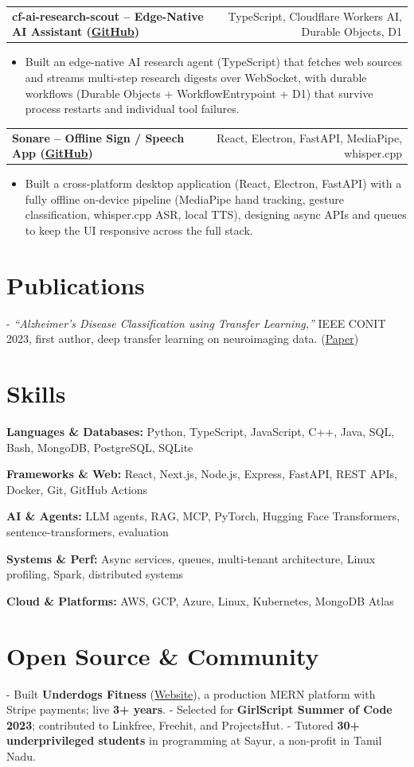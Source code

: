 \documentclass[letterpaper,11pt]{article}
\makeatletter
\newcommand{\projItem}[2]{%
  \vspace{2pt}
  \begin{tabular*}{\textwidth}{@{}l@{\extracolsep{\fill}}r@{}}
    \textbf{#1} & #2 \\
  \end{tabular*}\par\vspace{-3pt}
}
\newcommand{\skillLine}[2]{\textbf{#1:} #2\par\vspace{1.5pt}}
\newcommand{\inlineBlock}[1]{{\setlength{\leftskip}{0.18in}\small #1\par}}
\makeatother
\begin{document}
\projItem{cf-ai-research-scout -- Edge-Native AI Assistant {\normalfont\small(\href{https://github.com/Deva-1903/cf_ai_research_scout}{GitHub})}}{TypeScript, Cloudflare Workers AI, Durable Objects, D1}
\begin{itemize}
  \item Built an edge-native AI research agent (TypeScript) that fetches web sources and streams multi-step research digests over WebSocket, with durable workflows (Durable Objects + WorkflowEntrypoint + D1) that survive process restarts and individual tool failures.
\end{itemize}

\projItem{Sonare -- Offline Sign / Speech App {\normalfont\small(\href{https://github.com/Deva-1903/Qualcomm-Sep25-Team-Sonare}{GitHub})}}{React, Electron, FastAPI, MediaPipe, whisper.cpp}
\begin{itemize}
  \item Built a cross-platform desktop application (React, Electron, FastAPI) with a fully offline on-device pipeline (MediaPipe hand tracking, gesture classification, whisper.cpp ASR, local TTS), designing async APIs and queues to keep the UI responsive across the full stack.
\end{itemize}

\section{Publications}
\vspace{2pt}
\inlineBlock{- \textit{``Alzheimer's Disease Classification using Transfer Learning,''} IEEE CONIT 2023, first author, deep transfer learning on neuroimaging data. {\normalfont\small(\href{https://ieeexplore.ieee.org/document/10205760}{Paper})}}

\section{Skills}
\skillLine{Languages \& Databases}{Python, TypeScript, JavaScript, C++, Java, SQL, Bash, MongoDB, PostgreSQL, SQLite}
\skillLine{Frameworks \& Web}{React, Next.js, Node.js, Express, FastAPI, REST APIs, Docker, Git, GitHub Actions}
\skillLine{AI \& Agents}{LLM agents, RAG, MCP, PyTorch, Hugging Face Transformers, sentence-transformers, evaluation}
\skillLine{Systems \& Perf}{Async services, queues, multi-tenant architecture, Linux profiling, Spark, distributed systems}
\skillLine{Cloud \& Platforms}{AWS, GCP, Azure, Linux, Kubernetes, MongoDB Atlas}

\section{Open Source \& Community}
\inlineBlock{- Built \textbf{Underdogs Fitness} (\href{https://www.underdogsfitness.in/}{Website}), a production MERN platform with Stripe payments; live \textbf{3+ years}. - Selected for \textbf{GirlScript Summer of Code 2023}; contributed to Linkfree, Freehit, and ProjectsHut. - Tutored \textbf{30+ underprivileged students} in programming at Sayur, a non-profit in Tamil Nadu.}
\end{document}
